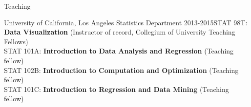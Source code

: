 \documentclass{resume} %
\begin{document}
\begin{rSection}{Teaching}
\begin{reSubsection}{University of California, Los Angeles }{ Statistics Department }{2013-2015}{STAT 98T: \textbf{Data Visualization }(Instructor of record, Collegium of University Teaching Fellows) \\
STAT 101A: \textbf{Introduction to Data Analysis and Regression} (Teaching fellow) \\
STAT 102B: \textbf{Introduction to Computation and Optimization} (Teaching fellow) \\
STAT 101C: \textbf{Introduction to Regression and Data Mining} (Teaching fellow) \\
}
\end{reSubsection}

\end{rSection}




\end{document}
